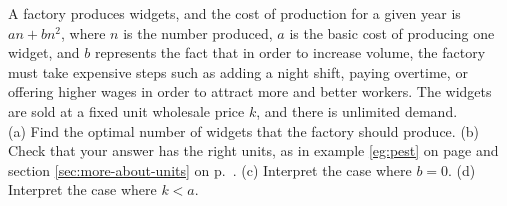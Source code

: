A factory produces widgets, and the cost of production for
a given year is $an+bn^2$, where $n$ is the number produced,
$a$ is the basic cost of producing one widget, and $b$
represents the fact that in order to increase volume, the
factory must take expensive steps such as adding a night
shift, paying overtime, or offering higher wages in order
to attract more and better workers. The widgets are sold
at a fixed unit wholesale price $k$, and there is unlimited demand.\\
(a) Find the optimal number of widgets that the factory
should produce. \answercheck\hwendpart
(b)  Check that your answer has the right units, as in example 
\ref{eg:pest} on page \pageref{eg:pest} and section \ref{sec:more-about-units} on p.~\pageref{sec:more-about-units}.\hwendpart
(c) Interpret the case where $b=0$.\hwendpart
(d) Interpret the case where $k<a$.\hwendpart
